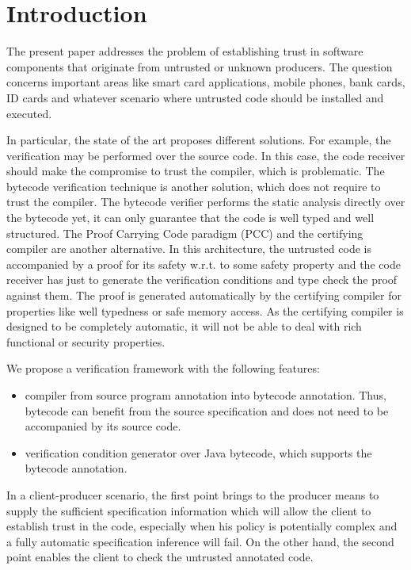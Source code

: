 
\section{Introduction}\label{intro}
The present paper addresses the  problem of establishing trust in software components that originate from untrusted or unknown producers. 
The question concerns important areas like 
smart card applications, mobile phones, bank cards, ID cards and whatever scenario where untrusted code should be installed and executed.

 In particular, the state of the art proposes different solutions. 
For example, the verification may be performed over the source code. 
In this case, the code receiver should make the compromise to trust the compiler, which is problematic. 
The bytecode verification technique \cite{Ljbc} is another solution, which does not require to trust the compiler. 
The bytecode verifier performs the static analysis directly over the bytecode yet, it can only guarantee that 
the code is well typed and well structured. %
The Proof Carrying Code paradigm (PCC) and the certifying compiler \cite{Necula97,ComNec,DesNecLee98} are another alternative.
 In this architecture, the untrusted code
is accompanied by a proof for its safety w.r.t. to some safety property and the code receiver has just to generate the 
verification conditions and type check the proof against them. 
The proof is generated automatically by the certifying compiler for properties like well typedness or safe memory access. 
As the certifying compiler is designed to be completely automatic, it will not be able to deal with rich functional or security properties. 
 
We propose a verification framework with the following features:
\begin{itemize}
  \item compiler from source program annotation into bytecode annotation.
 Thus, bytecode can benefit from the source specification and does not need to be accompanied by its source code. 

   \item verification condition generator over Java bytecode, which supports
the bytecode annotation. 
\end{itemize}


In a client-producer scenario, the first point brings to the producer means to supply the sufficient specification information 
which will allow the client to establish trust in the code, especially when his policy is potentially complex and a fully automatic specification inference
will fail. On the other hand, the second point enables the client to check the untrusted annotated code. 

